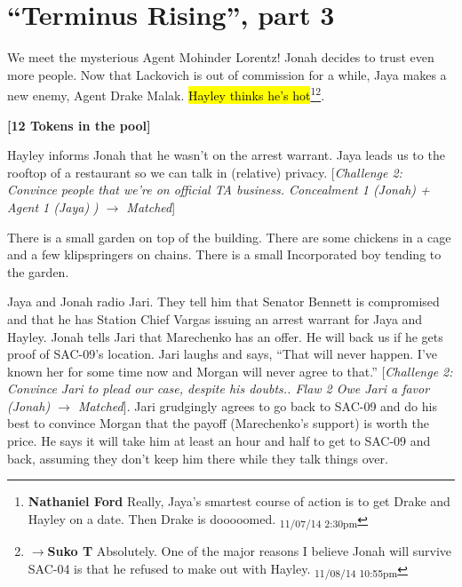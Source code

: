 \setcounter{chapter}{ 28 }
\chapter{\textbf{``Terminus Rising'', part 3} }









We meet the mysterious Agent Mohinder Lorentz!  Jonah decides to trust even more people.  Now that Lackovich is out of commission for a while, Jaya makes a new enemy, Agent Drake Malak. \hl{Hayley thinks he's hot}\footnote{\textbf{Nathaniel Ford }Really, Jaya's smartest course of action is to get Drake and Hayley on a date. Then Drake is dooooomed. \textsubscript{11/07/14 2:30pm}}\footnote{$\rightarrow$\textbf{Suko T }Absolutely.  One of the major reasons I believe Jonah will survive SAC-04 is that he refused to make out with Hayley. \textsubscript{11/08/14 10:55pm}}.






\textbf{{[}12 Tokens in the pool{]}}



Hayley informs Jonah that he wasn't on the arrest warrant.  Jaya leads us to the rooftop of a restaurant so we can talk in (relative) privacy.  {[}\textit{Challenge 2: Convince people that we're on official TA business.  Concealment 1 (Jonah) + Agent 1 (Jaya) }\textit{) $\rightarrow$ Matched}{]}



There is a small garden on top of the building.  There are some chickens in a cage and a few klipspringers on chains.  There is a small Incorporated boy tending to the garden.



Jaya and Jonah radio Jari.  They tell him that Senator Bennett is compromised and that he has Station Chief Vargas issuing an arrest warrant for Jaya and Hayley.  Jonah tells Jari that Marechenko has an offer.  He will back us if he gets proof of SAC-09's location.  Jari laughs and says, ``That will never happen.  I've known her for some time now and Morgan will never agree to that.''   {[}\textit{Challenge 2: Convince Jari to plead our case, despite his doubts..  Flaw 2 Owe Jari a favor (Jonah) $\rightarrow$ Matched}{]}.  Jari grudgingly agrees to go back to SAC-09 and do his best to convince Morgan that the payoff (Marechenko's support) is worth the price.  He says it will take him at least an hour and half to get to SAC-09 and back, assuming they don't keep him there while they talk things over.



